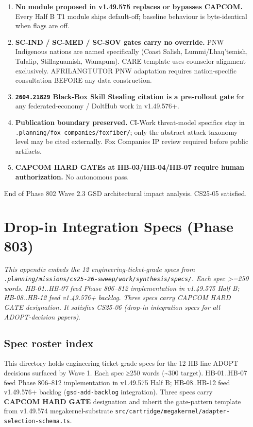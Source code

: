 \documentclass[11pt,letterpaper]{article}
\newcommand{\arxivid}[1]{\texttt{\textcolor{accent}{#1}}}
\providecommand{\tightlist}{\setlength{\itemsep}{0pt}\setlength{\parskip}{0pt}}
\begin{document}
\begin{enumerate}
\def\labelenumi{\arabic{enumi}.}
\tightlist
\item
  \textbf{No module proposed in v1.49.575 replaces or bypasses CAPCOM.}
  Every Half B T1 module ships default-off; baseline behaviour is
  byte-identical when flags are off.
\item
  \textbf{SC-IND / SC-MED / SC-SOV gates carry no override.} PNW
  Indigenous nations are named specifically (Coast Salish,
  Lummi/Lhaq'temish, Tulalip, Stillaguamish, Wanapum). CARE template
  uses counselor-alignment exclusively. AFRILANGTUTOR PNW adaptation
  requires nation-specific consultation BEFORE any data construction.
\item
  \textbf{\arxivid{2604.21829} Black-Box Skill Stealing citation is a
  pre-rollout gate} for any federated-economy / DoltHub work in
  v1.49.576+.
\item
  \textbf{Publication boundary preserved.} CI-Work threat-model
  specifics stay in \texttt{.planning/fox-companies/foxfiber/}; only the
  abstract attack-taxonomy level may be cited externally. Fox Companies
  IP review required before public artifacts.
\item
  \textbf{CAPCOM HARD GATEs at HB-03/HB-04/HB-07 require human
  authorization.} No autonomous pass.
\end{enumerate}

End of Phase 802 Wave 2.3 GSD architectural impact analysis. CS25-05
satisfied.


\clearpage

\section{Drop-in Integration Specs (Phase 803)}

\textit{This appendix embeds the 12 engineering-ticket-grade specs from \texttt{.planning/missions/cs25-26-sweep/work/synthesis/specs/}. Each spec \textgreater{}=250 words. HB-01..HB-07 feed Phase 806--812 implementation in v1.49.575 Half B; HB-08..HB-12 feed v1.49.576+ backlog. Three specs carry CAPCOM HARD GATE designation. It satisfies CS25-06 (drop-in integration specs for all ADOPT-decision papers).}

\subsection{Spec roster index}
This directory holds engineering-ticket-grade specs for the 12 HB-line
ADOPT decisions surfaced by Wave 1. Each spec ≥250 words
(\textasciitilde300 target). HB-01..HB-07 feed Phase 806--812
implementation in v1.49.575 Half B; HB-08..HB-12 feed v1.49.576+ backlog
(\texttt{gsd-add-backlog} integration). Three specs carry \textbf{CAPCOM
HARD GATE} designation and inherit the gate-pattern template from
v1.49.574 megakernel-substrate
\texttt{src/cartridge/megakernel/adapter-selection-schema.ts}.
\end{document}
